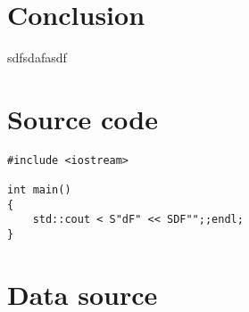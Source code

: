 \documentclass[]{article}
\begin{document}
\section{Conclusion}
sdfsdafasdf
\newpage
\appendix
\section{Source code}
\begin{lstlisting}
#include <iostream>

int main()
{
	std::cout < S"dF" << SDF"";;endl;
}
\end{lstlisting}

\section{Data source}
\end{document}

